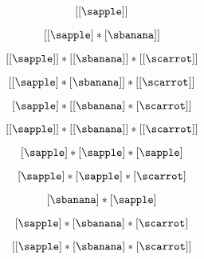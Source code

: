 {\begin{forslides}
        \begin{equation}
            \label{eq:fruit-sum-5}
            [ [ \sapple ] ]
        \end{equation}


        \begin{equation}
            \label{eq:fruit-sum-6}
            [ [ \sapple]   *  [\sbanana ] ]
        \end{equation}


        \begin{equation}
            \label{eq:fruit-sum-7}
            [ [ \sapple ] ] * [[ \sbanana ] ]  *  [[\scarrot]]
        \end{equation}

        \begin{equation}
            \label{eq:fruit-sum-7-bis}
            [ [ \sapple ]  * [ \sbanana ] ] *  [[\scarrot]]
        \end{equation}

        \begin{equation}
            \label{eq:fruit-sum-8}
            [ \sapple ]   *  [[ \sbanana ]  * [ \scarrot ]]
        \end{equation}

        \begin{equation}
            \label{eq:fruit-sum-9}
            [[ \sapple ]]  * [[ \sbanana ]] *  [[ \scarrot ]]
        \end{equation}


        \begin{equation}
            \label{eq:fruit-sum-10}
            [ \sapple ]   *  [ \sapple ]  *  [\sapple]
        \end{equation}

        \begin{equation}
            \label{eq:fruit-sum-11}
            [ \sapple ]   *  [ \sapple ]  * [ \scarrot ]
        \end{equation}

        \begin{equation}
            \label{eq:fruit-sum-12}
            [\sbanana ] * [ \sapple ]
        \end{equation}

        \begin{equation}
            \label{eq:fruit-sum-13}
            [ \sapple ]   *  [ \sbanana ]  *  [ \scarrot ]
        \end{equation}

        \begin{equation}
            \label{eq:fruit-sum-14}
            [ [ \sapple ]   *  [ \sbanana ]  *  [ \scarrot ] ]
        \end{equation}


\end{forslides}}
